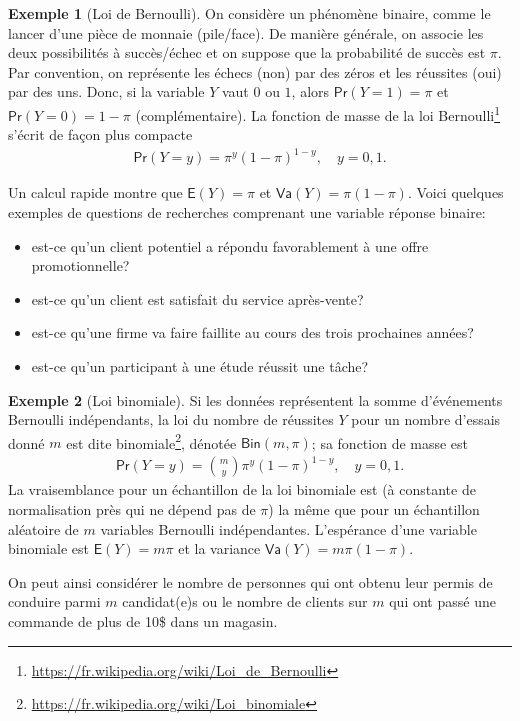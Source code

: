 \documentclass[
  11pt,
  letterpaper,
]{article}
\providecommand{\tightlist}{%
  \setlength{\itemsep}{0pt}\setlength{\parskip}{0pt}}
\renewcommand{\href}[2]{#2\footnote{\url{#1}}}
\theoremstyle{definition}
\theoremstyle{definition}
\newtheorem{example}{Exemple}[section]
\theoremstyle{definition}
\theoremstyle{remark}
\begin{document}
\begin{example}[Loi de Bernoulli]
\protect\hypertarget{exm:loibern}{}{\label{exm:loibern} {} }On considère un phénomène binaire, comme le lancer d'une pièce de monnaie (pile/face). De manière générale, on associe les deux possibilités à succès/échec et on suppose que la probabilité de succès est \(\pi\). Par convention, on représente les échecs (non) par des zéros et les réussites (oui) par des uns. Donc, si la variable \(Y\) vaut \(0\) ou \(1\), alors \(\mathsf{Pr}(Y=1)=\pi\) et \(\mathsf{Pr}(Y=0)=1-\pi\) (complémentaire). La fonction de masse de la \href{https://fr.wikipedia.org/wiki/Loi_de_Bernoulli}{loi Bernoulli} s'écrit de façon plus compacte
\begin{align*}
\mathsf{Pr}(Y=y) = \pi^y (1-\pi)^{1-y}, \quad y=0, 1.
\end{align*}

Un calcul rapide montre que \(\mathsf{E}(Y)=\pi\) et \(\mathsf{Va}(Y)=\pi(1-\pi)\).
Voici quelques exemples de questions de recherches comprenant une variable réponse binaire:

\begin{itemize}
\tightlist
\item
  est-ce qu'un client potentiel a répondu favorablement à une offre
  promotionnelle?
\item
  est-ce qu'un client est satisfait du service après-vente?
\item
  est-ce qu'une firme va faire faillite au cours des trois prochaines années?
\item
  est-ce qu'un participant à une étude réussit une tâche?
\end{itemize}
\end{example}

\begin{example}[Loi binomiale]
\protect\hypertarget{exm:loibinom}{}{\label{exm:loibinom} {} }Si les données représentent la somme d'événements Bernoulli indépendants, la loi du nombre de réussites \(Y\) pour un nombre d'essais donné \(m\) est dite \href{https://fr.wikipedia.org/wiki/Loi_binomiale}{binomiale}, dénotée \(\mathsf{Bin}(m, \pi)\); sa fonction de masse est
\begin{align*}
\mathsf{Pr}(Y=y) = \binom{m}{y}\pi^y (1-\pi)^{1-y}, \quad y=0, 1.
\end{align*}
La vraisemblance pour un échantillon de la loi binomiale est (à constante de normalisation près qui ne dépend pas de \(\pi\)) la même que pour un échantillon aléatoire de \(m\) variables Bernoulli indépendantes. L'espérance d'une variable binomiale est \(\mathsf{E}(Y)=m\pi\) et la variance \(\mathsf{Va}(Y)=m\pi(1-\pi)\).

On peut ainsi considérer le nombre de personnes qui ont obtenu leur permis de conduire parmi \(m\) candidat(e)s ou le nombre de clients sur \(m\) qui ont passé une commande de plus de 10\$ dans un magasin.
\end{example}
\end{document}
